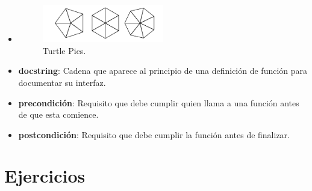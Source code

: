 \begin{itemize}
\begin{figure}[h]
        \end{figure}
    \item        
        \begin{figure}[h]
        \centering
        \includegraphics[width=0.5\textwidth]{./images/chapter_4_2.png}
        \caption{Turtle Pies.}
        \label{fig:4_2}
        \end{figure}
    \item \textbf{docstring}: Cadena que aparece al principio de una definición de función para documentar su interfaz.
    \item \textbf{precondición}: Requisito que debe cumplir quien llama a una función antes de que esta comience.
    \item \textbf{postcondición}: Requisito que debe cumplir la función antes de finalizar.
\end{itemize}

\section{Ejercicios}

